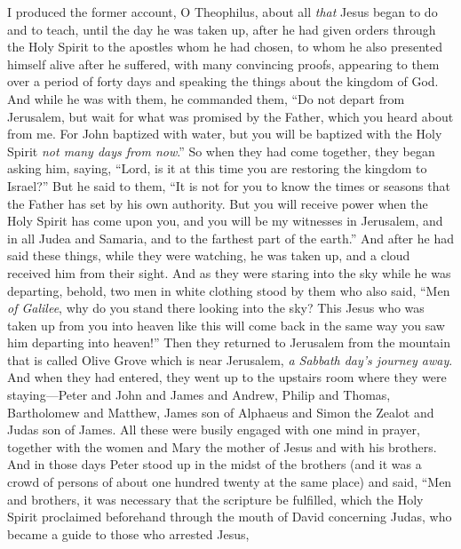 
\begin{biblechapter} %
 I produced the former account, O Theophilus, about all \textit{that} Jesus began to do and to teach,
\verse until the day he was taken up, after he had given orders through the Holy Spirit to the apostles whom he had chosen,
\verse to whom he also presented himself alive after he suffered, with many convincing proofs, appearing to them over a period of forty days and speaking the things about the kingdom of God.
\verse And while he was with them, he commanded them, “Do not depart from Jerusalem, but wait for what was promised by the Father, which you heard about from me.
\verse For John baptized with water, but you will be baptized with the Holy Spirit \textit{not many days from now}.”
 So when they had come together, they began asking him, saying, “Lord, is it at this time you are restoring the kingdom to Israel?”
\verse But he said to them, “It is not for you to know the times or seasons that the Father has set by his own authority.
\verse But you will receive power when the Holy Spirit has come upon you, and you will be my witnesses in Jerusalem, and in all Judea and Samaria, and to the farthest part of the earth.”
\verse And after he had said these things, while they were watching, he was taken up, and a cloud received him from their sight.
\verse And as they were staring into the sky while he was departing, behold, two men in white clothing stood by them
\verse who also said, “Men \textit{of Galilee}, why do you stand there looking into the sky? This Jesus who was taken up from you into heaven like this will come back in the same way you saw him departing into heaven!”
 Then they returned to Jerusalem from the mountain that is called Olive Grove which is near Jerusalem, \textit{a Sabbath day’s journey away}.
\verse And when they had entered, they went up to the upstairs room where they were staying—Peter and John and James and Andrew, Philip and Thomas, Bartholomew and Matthew, James son of Alphaeus and Simon the Zealot and Judas son of James.
\verse All these were busily engaged with one mind in prayer, together with the women and Mary the mother of Jesus and with his brothers.
\verse And in those days Peter stood up in the midst of the brothers (and it was a crowd of persons of about one hundred twenty at the same place) and said,
\verse “Men and brothers, it was necessary that the scripture be fulfilled, which the Holy Spirit proclaimed beforehand through the mouth of David concerning Judas, who became a guide to those who arrested Jesus,

\end{biblechapter}
